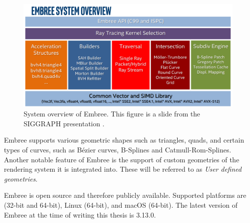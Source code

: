 \begin{figure}
	\centering
	\includegraphics[width=1\linewidth]{img/1 fundamentals/embree_overview.png}
	\caption{System overview of Embree. This figure is a slide from the SIGGRAPH presentation  \cite{embreeSlides}.}
	\label{fig:embree}
\end{figure}

Embree supports various geometric shapes such as triangles, quads, and certain types of curves, such as Bézier curves, B-Splines and Catmull-Rom-Splines.
Another notable feature of Embree is the support of custom geometries of the rendering system it is integrated into. These will be referred to as \emph{User defined geometries}.

Embree is open source and therefore publicly available. Supported platforms are (32-bit and 64-bit), Linux (64-bit), and macOS (64-bit). The latest version of Embree at the time of writing this thesis is 3.13.0. 